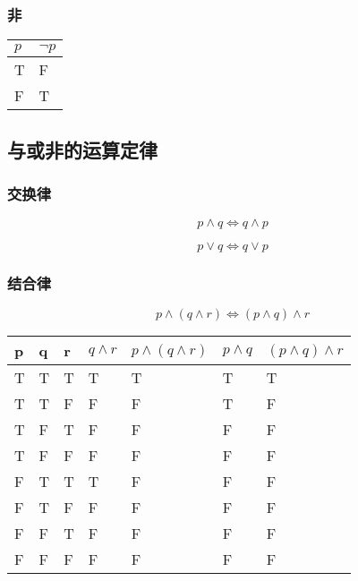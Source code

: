 \subsubsection{非}

\begin{table}[H]
    \begin{tabular}{l|l}
    $p$ & $\neg p$   \\ \hline 
    T   & F     \\
    F   & T                        
    \end{tabular}
\end{table}

\subsection{与或非的运算定律}

\subsubsection{交换律}

\begin{equation}
p \wedge q \iff q \wedge p
\end{equation}

\begin{equation}
p \vee q \iff q \vee p
\end{equation}

\subsubsection{结合律}

\begin{equation}
    p \wedge (q \wedge r) \iff (p \wedge q) \wedge r
\end{equation}

\begin{table}[H]
    \begin{tabular}{lll|l|l|l|l}
    p & q & r & $q \wedge r$ & $p \wedge (q \wedge r)$ & $p \wedge q$ & $(p \wedge q) \wedge r$ \\ \hline
    T & T & T & T            & T                       & T            & T                       \\
    T & T & F & F            & F                       & T            & F                       \\
    T & F & T & F            & F                       & F            & F                       \\
    T & F & F & F            & F                       & F            & F                       \\
    F & T & T & T            & F                       & F            & F                       \\
    F & T & F & F            & F                       & F            & F                       \\
    F & F & T & F            & F                       & F            & F                       \\
    F & F & F & F            & F                       & F            & F                      
    \end{tabular}
\end{table}

